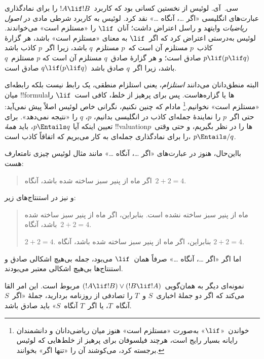 \documentclass[../../../include/open-logic-section]{subfiles}
\begin{document}


سی.~آی. لوئیس از نخستین کسانی بود که کاربرد~$!A \lif !B$ را برای
نمادگذاری عبارت‌های انگلیسی «اگر \dots، آنگاه \dots» نقد کرد. لوئیس
به کاربرد شرطی مادی در \emph{اصول ریاضیات} وایتهد و راسل اعتراض داشت؛
آنان~$\lif$ را «مستلزم است» می‌خواندند. لوئیس به‌درستی اعتراض کرد که
اگر~$\lif$ به معنای «مستلزم است» باشد، هر گزارهٔ کاذب~$p$ مستلزم آن
است که~$p$ مستلزم~$q$ باشد، زیرا اگر~$p$ کاذب باشد
$p \lif (p \lif q)$ صادق است؛ و هر گزارهٔ صادق~$q$ مستلزم آن است که
$p$ مستلزم~$q$ باشد، زیرا اگر~$q$ صادق باشد~$q \lif (p \lif q)$ صادق
است.

البته منطق‌دانان می‌دانند \emph{استلزام}، یعنی استلزام منطقی، یک رابط
نیست بلکه رابطه‌ای میان !!{formula}ها یا گزاره‌هاست. پس برای پرهیز از
خلط، کافی است~$\lif$ را «مستلزم است» نخوانیم.\footnote{خواندن~«$\lif$»
  به‌صورت «مستلزم است» هنوز میان ریاضی‌دانان و دانشمندان رایانه بسیار
  رایج است، هرچند فیلسوفان برای پرهیز از خلط‌هایی که لوئیس برجسته کرد،
  می‌کوشند آن را «تنها اگر» بخوانند.} مادام که چنین نکنیم، نگرانی خاص
لوئیس اصلاً پیش نمی‌آید: حتی اگر~$p$ را نمایندهٔ جمله‌ای کاذب در
انگلیسی بدانیم، $p$، $q$ را «نتیجه نمی‌دهد». برای تعیین اینکه آیا
$p \Entails q$، باید \emph{همهٔ} !!{valuation}ها را در نظر بگیریم، و
حتی وقتی~$p$ را برای نمادگذاری جمله‌ای به کار می‌بریم که اتفاقاً کاذب
است، $p \Entails/ q$.

بااین‌حال، هنوز در عبارت‌های «اگر \dots، آنگاه \dots» مانند مثال لوئیس
چیزی نامتعارف هست:
\begin{quote}
اگر ماه از پنیر سبز ساخته شده باشد، آنگاه~$2+2=4$.
\end{quote}
و نیز در استنتاج‌های زیر:
\begin{quote}
  ماه از پنیر سبز ساخته نشده است. بنابراین، اگر ماه از پنیر سبز ساخته
  شده باشد، آنگاه~$2+2=4$.

  $2+2 = 4$. بنابراین، اگر ماه از پنیر سبز ساخته شده باشد، آنگاه
  $2+2=4$.
\end{quote}
اما اگر «اگر \dots، آنگاه \dots» صرفاً همان~$\lif$ می‌بود، جمله
بی‌هیچ اشکالی صادق و استنتاج‌ها بی‌هیچ اشکالی معتبر می‌بودند.

نمونه‌ای دیگر به همان‌گویی~$(!A \lif !B) \lor (!B \lif !A)$ مربوط
است. این امر القا می‌کند که اگر دو جملهٔ اخباری~$S$ و~$T$ را تصادفی از
روزنامه بردارید، جملهٔ «اگر~$S$ آنگاه~$T$، یا اگر~$T$ آنگاه~$S$» باید
صادق باشد.
\end{document}
